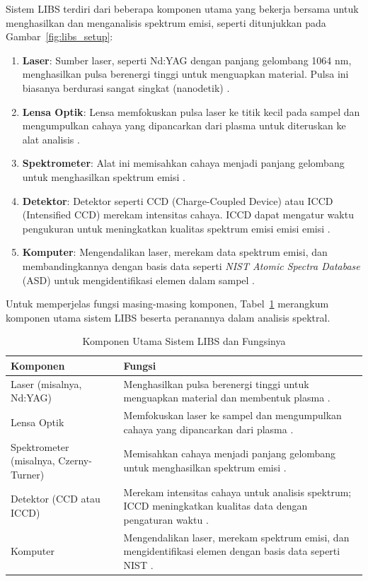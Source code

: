 Sistem LIBS terdiri dari beberapa komponen utama yang bekerja bersama untuk menghasilkan dan menganalisis spektrum emisi, seperti ditunjukkan pada Gambar~\ref{fig:libs_setup}:
\begin{enumerate}
    \item \textbf{Laser}: Sumber laser, seperti Nd:YAG dengan panjang gelombang 1064 nm, menghasilkan pulsa berenergi tinggi untuk menguapkan material. Pulsa ini biasanya berdurasi sangat singkat (nanodetik) \citep{Cremers2013}.
    \item \textbf{Lensa Optik}: Lensa memfokuskan pulsa laser ke titik kecil pada sampel dan mengumpulkan cahaya yang dipancarkan dari plasma untuk diteruskan ke alat analisis \citep{Miziolek2006}.
    \item \textbf{Spektrometer}: Alat ini memisahkan cahaya menjadi panjang gelombang untuk menghasilkan spektrum emisi \citep{Singh2007}.
    \item \textbf{Detektor}: Detektor seperti CCD (Charge-Coupled Device) atau ICCD (Intensified CCD) merekam intensitas cahaya. ICCD dapat mengatur waktu pengukuran untuk meningkatkan kualitas spektrum emisi emisi emisi \citep{Cremers2013}.
    \item \textbf{Komputer}: Mengendalikan laser, merekam data spektrum emisi, dan membandingkannya dengan basis data seperti \textit{NIST Atomic Spectra Database} (ASD) untuk mengidentifikasi elemen dalam sampel \citep{Kramida2023}.
\end{enumerate}
Untuk memperjelas fungsi masing-masing komponen, Tabel~\ref{tab:libs_components} merangkum komponen utama sistem LIBS beserta peranannya dalam analisis spektral.

\begin{table}[H]
\centering
\caption{Komponen Utama Sistem LIBS dan Fungsinya}
\label{tab:libs_components}
\begin{tabularx}{\textwidth}{>{\raggedright\arraybackslash}X>{\raggedright\arraybackslash}X}
\toprule
\textbf{Komponen} & \textbf{Fungsi} \\
\midrule
Laser (misalnya, Nd:YAG) & Menghasilkan pulsa berenergi tinggi untuk menguapkan material dan membentuk plasma \citep{Cremers2013}. \\
Lensa Optik & Memfokuskan laser ke sampel dan mengumpulkan cahaya yang dipancarkan dari plasma \citep{Miziolek2006}. \\
Spektrometer (misalnya, Czerny-Turner) & Memisahkan cahaya menjadi panjang gelombang untuk menghasilkan spektrum emisi \citep{Singh2007}. \\
Detektor (CCD atau ICCD) & Merekam intensitas cahaya untuk analisis spektrum; ICCD meningkatkan kualitas data dengan pengaturan waktu \citep{Cremers2013}. \\
Komputer & Mengendalikan laser, merekam spektrum emisi, dan mengidentifikasi elemen dengan basis data seperti NIST \citep{Kramida2023}. \\
\bottomrule
\end{tabularx}
\end{table}
